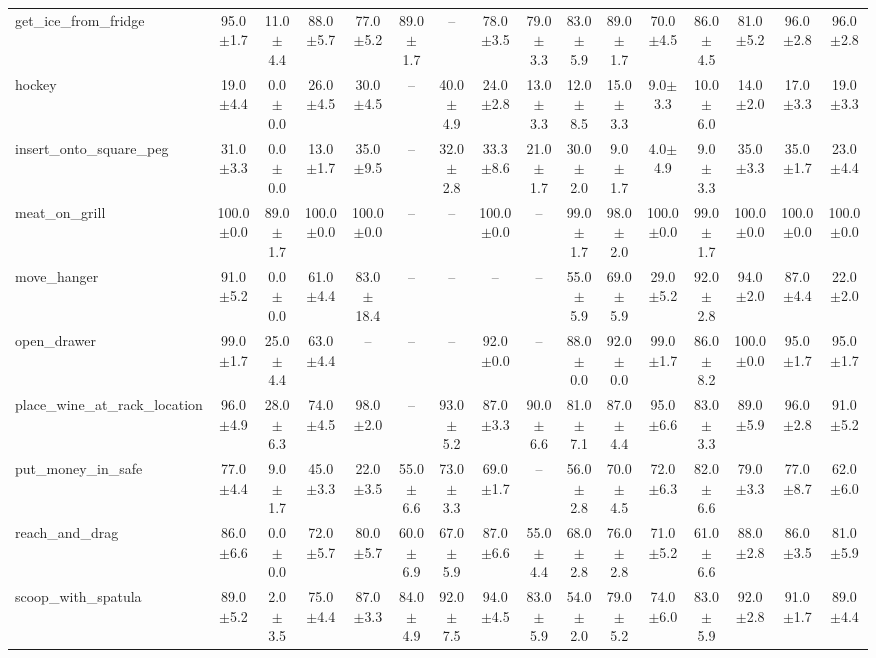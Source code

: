 \begin{table}[t]
{\begin{tabular}{l*{15}{c}}
get\_ice\_from\_fridge & 95.0$\pm$1.7 & 11.0$\pm$4.4 & 88.0$\pm$5.7 & 77.0$\pm$5.2 & 89.0$\pm$1.7 & -- & 78.0$\pm$3.5 & 79.0$\pm$3.3 & 83.0$\pm$5.9 & 89.0$\pm$1.7 & 70.0$\pm$4.5 & 86.0$\pm$4.5 & 81.0$\pm$5.2 & 96.0$\pm$2.8 & 96.0$\pm$2.8 \\
hockey & 19.0$\pm$4.4 & 0.0$\pm$0.0 & 26.0$\pm$4.5 & 30.0$\pm$4.5 & -- & 40.0$\pm$4.9 & 24.0$\pm$2.8 & 13.0$\pm$3.3 & 12.0$\pm$8.5 & 15.0$\pm$3.3 & 9.0$\pm$3.3 & 10.0$\pm$6.0 & 14.0$\pm$2.0 & 17.0$\pm$3.3 & 19.0$\pm$3.3 \\
insert\_onto\_square\_peg & 31.0$\pm$3.3 & 0.0$\pm$0.0 & 13.0$\pm$1.7 & 35.0$\pm$9.5 & -- & 32.0$\pm$2.8 & 33.3$\pm$8.6 & 21.0$\pm$1.7 & 30.0$\pm$2.0 & 9.0$\pm$1.7 & 4.0$\pm$4.9 & 9.0$\pm$3.3 & 35.0$\pm$3.3 & 35.0$\pm$1.7 & 23.0$\pm$4.4 \\
meat\_on\_grill & 100.0$\pm$0.0 & 89.0$\pm$1.7 & 100.0$\pm$0.0 & 100.0$\pm$0.0 & -- & -- & 100.0$\pm$0.0 & -- & 99.0$\pm$1.7 & 98.0$\pm$2.0 & 100.0$\pm$0.0 & 99.0$\pm$1.7 & 100.0$\pm$0.0 & 100.0$\pm$0.0 & 100.0$\pm$0.0 \\
move\_hanger & 91.0$\pm$5.2 & 0.0$\pm$0.0 & 61.0$\pm$4.4 & 83.0$\pm$18.4 & -- & -- & -- & -- & 55.0$\pm$5.9 & 69.0$\pm$5.9 & 29.0$\pm$5.2 & 92.0$\pm$2.8 & 94.0$\pm$2.0 & 87.0$\pm$4.4 & 22.0$\pm$2.0 \\
open\_drawer & 99.0$\pm$1.7 & 25.0$\pm$4.4 & 63.0$\pm$4.4 & -- & -- & -- & 92.0$\pm$0.0 & -- & 88.0$\pm$0.0 & 92.0$\pm$0.0 & 99.0$\pm$1.7 & 86.0$\pm$8.2 & 100.0$\pm$0.0 & 95.0$\pm$1.7 & 95.0$\pm$1.7 \\
place\_wine\_at\_rack\_location & 96.0$\pm$4.9 & 28.0$\pm$6.3 & 74.0$\pm$4.5 & 98.0$\pm$2.0 & -- & 93.0$\pm$5.2 & 87.0$\pm$3.3 & 90.0$\pm$6.6 & 81.0$\pm$7.1 & 87.0$\pm$4.4 & 95.0$\pm$6.6 & 83.0$\pm$3.3 & 89.0$\pm$5.9 & 96.0$\pm$2.8 & 91.0$\pm$5.2 \\
put\_money\_in\_safe & 77.0$\pm$4.4 & 9.0$\pm$1.7 & 45.0$\pm$3.3 & 22.0$\pm$3.5 & 55.0$\pm$6.6 & 73.0$\pm$3.3 & 69.0$\pm$1.7 & -- & 56.0$\pm$2.8 & 70.0$\pm$4.5 & 72.0$\pm$6.3 & 82.0$\pm$6.6 & 79.0$\pm$3.3 & 77.0$\pm$8.7 & 62.0$\pm$6.0 \\
reach\_and\_drag & 86.0$\pm$6.6 & 0.0$\pm$0.0 & 72.0$\pm$5.7 & 80.0$\pm$5.7 & 60.0$\pm$6.9 & 67.0$\pm$5.9 & 87.0$\pm$6.6 & 55.0$\pm$4.4 & 68.0$\pm$2.8 & 76.0$\pm$2.8 & 71.0$\pm$5.2 & 61.0$\pm$6.6 & 88.0$\pm$2.8 & 86.0$\pm$3.5 & 81.0$\pm$5.9 \\
scoop\_with\_spatula & 89.0$\pm$5.2 & 2.0$\pm$3.5 & 75.0$\pm$4.4 & 87.0$\pm$3.3 & 84.0$\pm$4.9 & 92.0$\pm$7.5 & 94.0$\pm$4.5 & 83.0$\pm$5.9 & 54.0$\pm$2.0 & 79.0$\pm$5.2 & 74.0$\pm$6.0 & 83.0$\pm$5.9 & 92.0$\pm$2.8 & 91.0$\pm$1.7 & 89.0$\pm$4.4 \\

\end{tabular}}
\end{table}
